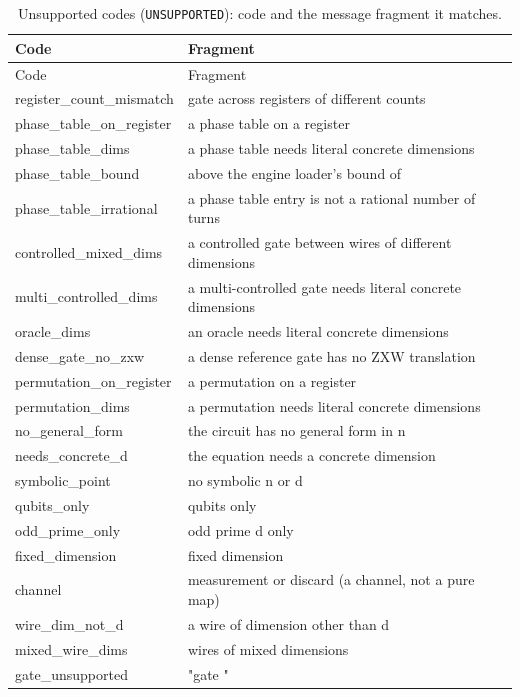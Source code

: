 \begin{xltabular}{\textwidth}{@{}>{\ttfamily}p{0.3\textwidth} >{\ttfamily}X@{}}
\caption{Unsupported codes (\texttt{UNSUPPORTED}): code and the message fragment it matches.}\label{tab:bench-unsupported}\\
\toprule
\normalfont Code & \normalfont Fragment\\
\midrule\endfirsthead
\toprule
\normalfont Code & \normalfont Fragment\\
\midrule\endhead
\bottomrule\endfoot
register\_count\_mismatch & gate across registers of different counts\\
phase\_table\_on\_register & a phase table on a register\\
phase\_table\_dims & a phase table needs literal concrete dimensions\\
phase\_table\_bound & above the engine loader's bound of\\
phase\_table\_irrational & a phase table entry is not a rational number of turns\\
controlled\_mixed\_dims & a controlled gate between wires of different dimensions\\
multi\_controlled\_dims & a multi-controlled gate needs literal concrete dimensions\\
oracle\_dims & an oracle needs literal concrete dimensions\\
dense\_gate\_no\_zxw & a dense reference gate has no ZXW translation\\
permutation\_on\_register & a permutation on a register\\
permutation\_dims & a permutation needs literal concrete dimensions\\
no\_general\_form & the circuit has no general form in n\\
needs\_concrete\_d & the equation needs a concrete dimension\\
symbolic\_point & no symbolic n or d\\
qubits\_only & qubits only\\
odd\_prime\_only & odd prime d only\\
fixed\_dimension & fixed dimension\\
channel & measurement or discard (a channel, not a pure map)\\
wire\_dim\_not\_d & a wire of dimension other than d\\
mixed\_wire\_dims & wires of mixed dimensions\\
gate\_unsupported & "gate "\\

\end{xltabular}
